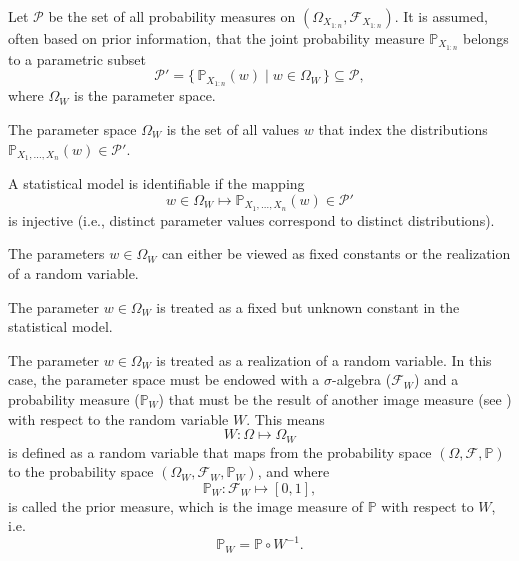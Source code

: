 \begin{definition}
	Let $\mathcal{P}$ be the set of all probability measures on $(\Omega_{X_{1:n}},\mathcal{F}_{X_{1:n}})$. It is assumed, often based on prior information, that the joint probability measure $\mathbb{P}_{X_{1:n}}$ belongs to a parametric subset
	\begin{equation}
		\mathcal{P}' = \{\, \mathbb{P}_{X_{1:n}}(w) \mid w \in \Omega_W \,\} \subseteq \mathcal{P},
	\end{equation}
	where $\Omega_W$ is the parameter space.
\end{definition}

\begin{definition}
	\label{def:parameter_space}
	The parameter space $\Omega_W$ is the set of all values $w$ that index the distributions $\mathbb{P}_{X_1,\dots,X_n}(w)\in \mathcal{P}'$.
\end{definition}

\begin{definition}
	A statistical model is identifiable if the mapping 
	\begin{equation}
		w \in \Omega_W \mapsto \mathbb{P}_{X_1,\dots,X_n}(w) \in \mathcal{P}'
	\end{equation}
	is injective (i.e., distinct parameter values correspond to distinct distributions).
\end{definition}

The parameters $w\in \Omega_W$ can either be viewed as fixed constants or the realization of a random variable.
\begin{axiom}
	\label{ax:parameter_fixed}
	The parameter $w\in \Omega_W$ is treated as a fixed but unknown constant in the statistical model.
\end{axiom}
\begin{axiom}
	\label{ax:parameter_variable}
	The parameter $w\in \Omega_W$ is treated as a realization of a random variable. In this case, the parameter space must be endowed with a $\sigma$-algebra ($\mathcal{F}_W$) and a probability measure ($\mathbb{P}_W$) that must be the result of another image measure (see  ) with respect to the random variable $W$. This means
	\begin{equation}
		W: \Omega \mapsto \Omega_W
	\end{equation}
	is defined as a random variable that maps from the probability space $(\Omega, \mathcal{F}, \mathbb{P})$ to the probability space $(\Omega_W,\mathcal{F}_W,\mathbb{P}_W)$, and where
	\begin{equation}
		\mathbb{P}_W: \mathcal{F}_W \mapsto [0,1],
	\end{equation}
	is called the prior measure, which is the image measure of $\mathbb{P}$ with respect to $W$, i.e.
	\begin{equation}
		\mathbb{P}_W = \mathbb{P}\circ W^{-1}.
	\end{equation}
\end{axiom}

